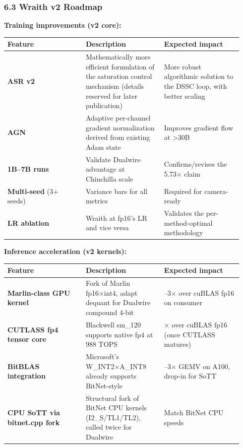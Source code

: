 \subsubsection{6.3 Wraith v2 Roadmap}\label{wraith-v2-roadmap}

\textbf{Training improvements (v2 core):}

{\def\LTcaptype{none} %
{\footnotesize\setlength{\tabcolsep}{3pt}
\begin{longtable}[]{@{}>{\raggedright\arraybackslash}p{0.313\linewidth}>{\raggedright\arraybackslash}p{0.313\linewidth}>{\raggedright\arraybackslash}p{0.313\linewidth}@{}}
\toprule\noalign{}
Feature & Description & Expected impact \\
\midrule\noalign{}
\endhead
\bottomrule\noalign{}
\endlastfoot
\textbf{ASR v2} & Mathematically more efficient formulation of the
saturation control mechanism (details reserved for later publication) &
More robust algorithmic solution to the DSSC loop, with better
scaling \\
\textbf{AGN} & Adaptive per-channel gradient normalization derived from
existing Adam state & Improves gradient flow at \textgreater30B \\
\textbf{1B--7B runs} & Validate Dualwire advantage at Chinchilla scale &
Confirms/revises the 5.73× claim \\
\textbf{Multi-seed} (3+ seeds) & Variance bars for all metrics &
Required for camera-ready \\
\textbf{LR ablation} & Wraith at fp16's LR and vice versa & Validates
the per-method-optimal methodology \\
\end{longtable}
}
}

\textbf{Inference acceleration (v2 kernels):}

{\def\LTcaptype{none} %
{\footnotesize\setlength{\tabcolsep}{3pt}
\begin{longtable}[]{@{}>{\raggedright\arraybackslash}p{0.313\linewidth}>{\raggedright\arraybackslash}p{0.313\linewidth}>{\raggedright\arraybackslash}p{0.313\linewidth}@{}}
\toprule\noalign{}
Feature & Description & Expected impact \\
\midrule\noalign{}
\endhead
\bottomrule\noalign{}
\endlastfoot
\textbf{Marlin-class GPU kernel} & Fork of Marlin fp16×int4, adapt
dequant for Dualwire compound 4-bit & 2--3× over cuBLAS fp16 on
consumer \\
\textbf{CUTLASS fp4 tensor core} & Blackwell sm\_120 supports native fp4
at 988 TOPS & 4× over cuBLAS fp16 (once CUTLASS matures) \\
\textbf{BitBLAS integration} & Microsoft's W\_INT2×A\_INT8 already
supports BitNet-style & 2--3× GEMV on A100, drop-in for SoTT \\
\textbf{CPU SoTT via bitnet.cpp fork} & Structural fork of BitNet CPU
kernels (I2\_S/TL1/TL2), called twice for Dualwire & Match BitNet CPU
speeds \\
\end{longtable}
}
}

